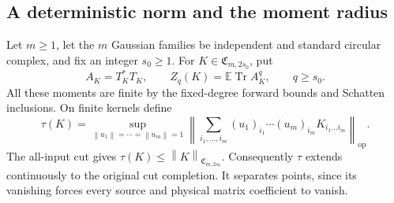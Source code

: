 \documentclass[11pt,a4paper]{amsart}
\numberwithin{equation}{section}
\theoremstyle{definition}
\theoremstyle{remark}
\newcommand{\E}{\mathbb E}
\newcommand{\Coeff}{\mathfrak C}
\DeclareMathOperator{\Tr}{Tr}
\newcommand{\op}{\mathrm{op}}
\newcommand{\norm}[1]{\left\lVert#1\right\rVert}
\begin{document}
\subsection{A deterministic norm and the moment radius}
Let $m\ge1$, let the $m$ Gaussian families be independent and standard circular complex, and fix an integer $s_0\ge1$. For $K\in\Coeff_{m,2s_0}$, put
\[
 A_K=T_K^*T_K,\qquad Z_q(K)=\E\Tr A_K^q,\qquad q\ge s_0.
\]
All these moments are finite by the fixed-degree forward bounds and Schatten inclusions. On finite kernels define
\begin{equation}\label{eq:multilinear_tau}
 \tau(K)=\sup_{\norm{u_1}=\cdots=\norm{u_m}=1}
 \left\|\sum_{i_1,\ldots,i_m}(u_1)_{i_1}\cdots(u_m)_{i_m}
                 K_{i_1\ldots i_m}\right\|_{\op}.
\end{equation}
The all-input cut gives $\tau(K)\le\norm K_{\Coeff_{m,2s_0}}$. Consequently $\tau$ extends continuously to the original cut completion. It separates points, since its vanishing forces every source and physical matrix coefficient to vanish.
\end{document}
